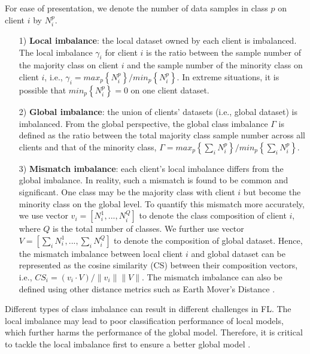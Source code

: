 \documentclass[10pt,journal,compsoc]{IEEEtran}
\begin{document}
For ease of presentation, we denote the number of data samples in class $ p $ on client $ i $ by $ N _{i}^{p} $. 
\begin{itemize}
	\item[1)] \textbf{Local imbalance}: the local dataset owned by each client is imbalanced. The local imbalance $ \gamma_{i} $ for client $ i $ is the ratio between the sample number of the majority class on client $ i $ and the sample number of the minority class on client $ i $, i.e., $ \gamma_{i} = max_{p}\left\lbrace N _{i}^{p}\right\rbrace / min_{p}\left\lbrace N _{i}^{p}\right\rbrace  $. In extreme situations, it is possible that $ min_{p}\left\lbrace N _{i}^{p}\right\rbrace=0 $ on one client dataset. 
	
	\item[2)] \textbf{Global imbalance}: the union of clients' datasets (i.e., global dataset) is imbalanced. From the global perspective, the global class imbalance $ \Gamma$ is defined as the ratio between the total majority class sample number across all clients and that of the minority class, $ \Gamma = max_{p}  \left\lbrace {\textstyle \sum_{i}^{}}N _{i}^{p}\right\rbrace / min_{p}\left\lbrace {\textstyle \sum_{i}^{}}N _{i}^{p}\right\rbrace  $.
	
	\item[3)] \textbf{Mismatch imbalance}: each client's local imbalance differs from the global imbalance. In reality, such a mismatch is found to be common and significant. One class may be the majority class with client $i$ but become the minority class on the global level. To quantify this mismatch more accurately, we use vector $ v_{i} = [N _{i}^{1},..., N _{i}^{Q} ] $ to denote the class composition of client $ i $, where $ Q $ is the total number of classes. We further use vector $  V =[{\textstyle \sum_{i}^{}}N _{i}^{1},..., {\textstyle \sum_{i}^{}}N _{i}^{Q} ] $ to denote the composition of global dataset. Hence, the mismatch imbalance between local client $i$ and global dataset can be represented as the cosine similarity (CS) between their composition vectors, i.e., $ CS_{i} = (v_{i} \cdot  V ) / \parallel v_{i}\parallel  \parallel V\parallel  $. The mismatch imbalance can also be defined using other distance metrics such as Earth Mover's Distance \cite{zhang2021dubhe}.
\end{itemize}

Different types of class imbalance can result in different challenges in FL. The local imbalance may lead to poor classification performance of local models, which further harms the performance of the global model. Therefore, it is critical to tackle the local imbalance first to ensure a better global model \cite{ran2021dynamic}. 
\end{document}
